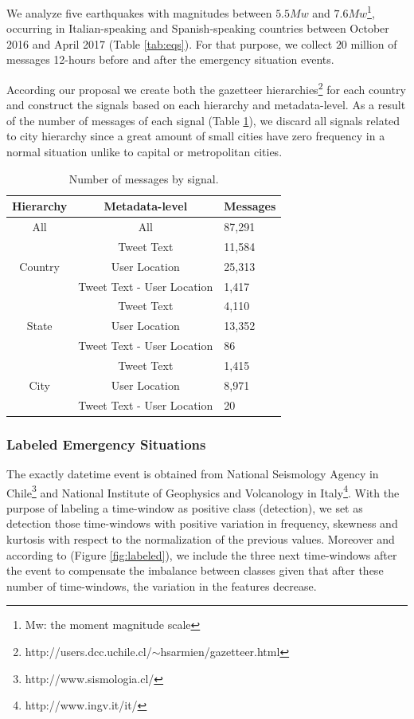 \documentclass[sigconf]{acmart}
\begin{document}
We analyze five earthquakes with magnitudes between $5.5Mw$ and $7.6Mw$\footnote{Mw: the moment magnitude scale}, occurring in Italian-speaking and Spanish-speaking countries between October 2016 and April 2017 (Table \ref{tab:eqs}). For that purpose, we collect $20$ million of messages 12-hours before and after the emergency situation events. 

According our proposal we create both the gazetteer hierarchies\footnote{http://users.dcc.uchile.cl/$\sim$hsarmien/gazetteer.html} for each country and construct the signals based on each hierarchy and metadata-level. As a result of the number of messages of each signal (Table \ref{tab:message_signal}), we discard all signals related to city hierarchy since a great amount of small cities have zero frequency in a normal situation unlike to capital or metropolitan cities.




\begin{table}
	\caption{Number of messages by signal.}
	\label{tab:message_signal}
	\begin{tabular}{ccl}
		\toprule
		Hierarchy&Metadata-level&Messages\\
		\midrule
		All & All & 87,291 \\
		\midrule
	    \multirow{3}{*}{Country} & Tweet Text & 11,584 \\
	    & User Location & 25,313\\
	    & Tweet Text - User Location & 1,417\\	
		\bottomrule
		\multirow{3}{*}{State} & Tweet Text & 4,110 \\
		& User Location & 13,352\\
		& Tweet Text - User Location & 86\\
		\midrule
		\multirow{3}{*}{City} & Tweet Text & 1,415 \\
		& User Location & 8,971\\
		& Tweet Text - User Location & 20\\
		\bottomrule
	\end{tabular}
\end{table} 

\subsubsection{Labeled Emergency Situations}

The exactly datetime event is obtained from National Seismology Agency in Chile\footnote{http://www.sismologia.cl/} and 
National Institute of Geophysics and Volcanology in Italy\footnote{http://www.ingv.it/it/}. With the purpose of labeling a time-window as positive class (detection), we set as detection those time-windows with positive variation in frequency, skewness and kurtosis with respect to the normalization of the previous values. Moreover and according to (Figure \ref{fig:labeled}), we include the three next time-windows after the event to compensate the imbalance between classes given that after these number of time-windows, the variation in the features decrease.
\end{document}
